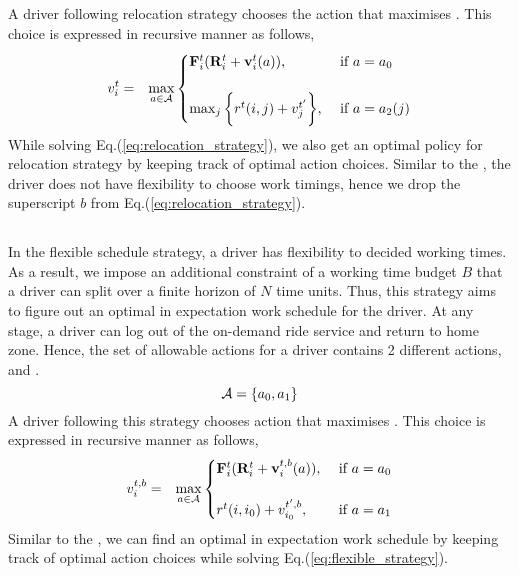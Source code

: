 A driver following relocation strategy chooses the action that maximises {\totalexpectedearnings}. This choice is expressed in recursive manner as follows,
\begin{eqnarray}
\label{eq:relocation_strategy}
v_{i}^{t} &=& \max_{a \in \mathcal{A}}
    \begin{cases}
    {\ensuremath{\mathbf{F}}}_{i}^{t} ({\mathbf{R}}_{i}^{t} +  \mathbf{v}_{i}^{t}({a})), &\textrm{  if } a = a_0\\ \\
    \max_{j} \bigg\{r^t(i,j) + v_{j}^{t'}\bigg\}, &\textrm{  if } a = a_2(j)
    \end{cases}
\end{eqnarray}
While solving Eq.(\ref{eq:relocation_strategy}), we also get an optimal policy for relocation strategy by keeping track of optimal action choices. Similar to the {\naive}, the driver does not have flexibility to choose work timings, hence we drop the superscript $b$ from Eq.(\ref{eq:relocation_strategy}).

\subsection{\flexible}

In the flexible schedule strategy, a driver has flexibility to decided working times. As a result, we impose an additional constraint of a working time budget $B$ that a driver can split over a finite horizon of $N$ time units. Thus, this strategy aims to figure out an optimal in expectation work schedule for the driver. At any stage, a driver can log out of the on-demand ride service and return to home zone. Hence, the set of allowable actions for a driver contains 2 different actions, {\getpassenger} and {\gohome}. 
\begin{equation}
\mathcal{A} = \{a_0, a_1\}
\end{equation}
A driver following this strategy chooses action that maximises {\totalexpectedearnings}. This choice is expressed in recursive manner as follows,
\begin{eqnarray}
\label{eq:flexible_strategy}
v_{i}^{t,b} &=& \max_{a \in \mathcal{A}}
    \begin{cases}
    {\ensuremath{\mathbf{F}}}_{i}^{t} ({\mathbf{R}}_{i}^{t} +  \mathbf{v}_{i}^{t,b}({a})), &\textrm{  if } a = a_0\\ \\
    r^t(i,{i_0}) + v_{{i_0}}^{t',b}, &\textrm{  if } a = a_1
    \end{cases}
\end{eqnarray}
Similar to the {\relocation}, we can find an optimal in expectation work schedule by keeping track of optimal action choices while solving Eq.(\ref{eq:flexible_strategy}).

